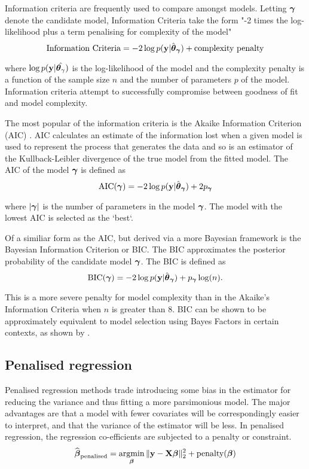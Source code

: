 
Information criteria are frequently used to compare amongst models. Letting ${\boldsymbol \gamma}$ denote the candidate model,
Information Criteria take the form "-2 times the log-likelihood plus a term penalising for complexity of
the model"
\[
	\text{Information Criteria} = -2 \log p({\bf y} | \hat{{\boldsymbol \theta}}_{\boldsymbol \gamma}) + \text{complexity penalty}
\]

\noindent where $\log p({\bf y} | \hat{{\boldsymbol \theta}_\gamma})$ is the log-likelihood of the model and the complexity
penalty is a function of the sample size $n$ and the number of parameters $p$ of the model. Information
criteria attempt to successfully compromise between goodness of fit and model complexity.

The most popular of the information criteria is the Akaike Information Criterion (AIC) \citep{Akaike1974}. AIC
calculates an estimate of the information lost when a given model is used to represent the process that
generates the data and so is an estimator of the Kullback-Leibler divergence of the true model from the fitted
model. The AIC of the model ${\boldsymbol \gamma}$ is defined as
\[
	\text{AIC}({\boldsymbol \gamma}) = -2 \log p({\bf y} | \hat{{\boldsymbol \theta}}_{\boldsymbol \gamma}) + 2 p_{\boldsymbol \gamma}
\]

\noindent where $|{\boldsymbol \gamma}|$ is the number of parameters in the model ${\boldsymbol \gamma}$. The model with the lowest AIC
is selected as the `best`.

Of a similiar form as the AIC, but derived via a more Bayesian framework is the Bayesian Information Criterion
or BIC. The BIC approximates the posterior probability of the candidate model ${\boldsymbol \gamma}$. The BIC is defined as
\[
	\text{BIC}({\boldsymbol \gamma}) = -2 \log p({\bf y} | \hat{{\boldsymbol \theta}}_{\boldsymbol \gamma}) + p_{\boldsymbol \gamma} \log(n).
\]

\noindent This is a more severe penalty for model complexity than in the Akaike's Information Criteria when
$n$ is greater than $8$. BIC can be shown to be approximately equivalent to model selection using Bayes
Factors in certain contexts, as shown by \cite{Kass1993}.

\subsection{Penalised regression}
Penalised regression methods trade introducing some bias in the estimator for reducing the variance and thus
fitting a more parsimonious model. The major advantages are that a model with fewer covariates will be
correspondingly easier to interpret, and that the variance of the estimator will be less. In penalised
regression, the regression co-efficients are subjected to a penalty or constraint.
$$
\widehat{\vbeta}_{\text{penalised}} = \argmin_\vbeta \|\vy - \mX \vbeta\|_2^2 + \text{penalty}(\vbeta)
$$

